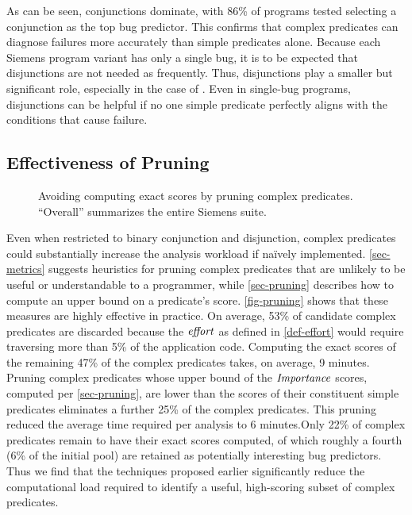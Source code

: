 As can be seen, conjunctions dominate, with 86\% of programs tested selecting a conjunction as the top bug predictor.  This confirms that complex predicates can diagnose failures more accurately than simple predicates alone.  Because each Siemens program variant has only a single bug, it is to be expected that disjunctions are not needed as frequently.  Thus, disjunctions play a smaller but significant role, especially in the case of .  Even in single-bug programs, disjunctions can be helpful if no one simple predicate perfectly aligns with the conditions that cause failure.

\subsection{Effectiveness of Pruning}
\label{sec-effectprune}

\begin{figure*}[tb]
  \centering
  \hfill
  \caption{Avoiding computing exact scores by pruning complex predicates.  ``Overall'' summarizes the entire Siemens suite.}
  \label{fig-pruning}
\end{figure*}

Even when restricted to binary conjunction and disjunction, complex predicates could substantially increase the analysis workload if na\"ively implemented.  \autoref{sec-metrics} suggests heuristics for pruning complex predicates that are unlikely to be useful or understandable to a programmer, while \autoref{sec-pruning} describes how to compute an upper bound on a predicate's score.  \autoref{fig-pruning} shows that these measures are highly effective in practice.  On average, 53\% of candidate complex predicates are discarded because the $\mathit{effort}$ as defined in \autoref{def-effort} would require traversing more than 5\% of the application code. Computing the exact scores of the remaining 47\% of the complex predicates takes, on average, 9 minutes.  Pruning complex predicates whose upper bound of the $\mathit{Importance}$ scores, computed per \autoref{sec-pruning}, are lower than the scores of their constituent simple predicates eliminates a further 25\% of the complex predicates.  This pruning reduced the average time required per analysis to 6 minutes.Only 22\% of complex predicates remain to have their exact scores computed, of which roughly a fourth (6\% of the initial pool) are retained as potentially interesting bug predictors.  Thus we find that the techniques proposed earlier significantly reduce the computational load required to identify a useful, high-scoring subset of complex predicates.

